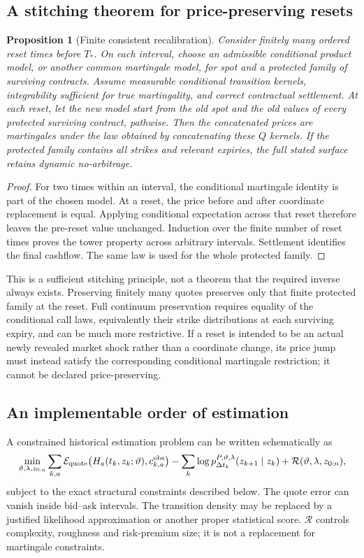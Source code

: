 \documentclass[11pt,a4paper]{article}
\numberwithin{equation}{section}
\newtheorem{proposition}[theorem]{Proposition}
\theoremstyle{definition}\newtheorem{definition}[theorem]{Definition}
\theoremstyle{remark}\newtheorem{remark}[theorem]{Remark}
\begin{document}
\subsection{A stitching theorem for price-preserving resets}
\begin{proposition}[Finite consistent recalibration]
\label{prop:stitch}
Consider finitely many ordered reset times before $T_*$. On each interval, choose an admissible conditional product model, or another common martingale model, for spot and a protected family of surviving contracts. Assume measurable conditional transition kernels, integrability sufficient for true martingality, and correct contractual settlement. At each reset, let the new model start from the old spot and the old values of every protected surviving contract, pathwise. Then the concatenated prices are martingales under the law obtained by concatenating these $Q$ kernels. If the protected family contains all strikes and relevant expiries, the full stated surface retains dynamic no-arbitrage.
\end{proposition}
\begin{proof}
For two times within an interval, the conditional martingale identity is part of the chosen model. At a reset, the price before and after coordinate replacement is equal. Applying conditional expectation across that reset therefore leaves the pre-reset value unchanged. Induction over the finite number of reset times proves the tower property across arbitrary intervals. Settlement identifies the final cashflow. The same law is used for the whole protected family.
\end{proof}
This is a sufficient stitching principle, not a theorem that the required inverse always exists. Preserving finitely many quotes preserves only that finite protected family at the reset. Full continuum preservation requires equality of the conditional call laws, equivalently their strike distributions at each surviving expiry, and can be much more restrictive. If a reset is intended to be an actual newly revealed market shock rather than a coordinate change, its price jump must instead satisfy the corresponding conditional martingale restriction; it cannot be declared price-preserving.

\subsection{An implementable order of estimation}
A constrained historical estimation problem can be written schematically as
\begin{equation}
 \min_{\vartheta,\lambda,z_{0:n}}
 \sum_{k,a}\mathcal E_{\rm quote}\!\left(H_a(t_k,z_k;\vartheta),c_{k,a}^{\rm obs}\right)
 -\sum_{k}\log p^{P,\vartheta,\lambda}_{\Delta t_k}(z_{k+1}\mid z_k)
 +\mathcal R(\vartheta,\lambda,z_{0:n}),
 \label{eq:joint-fit}
\end{equation}
subject to the exact structural constraints described below. The quote error can vanish inside bid--ask intervals. The transition density may be replaced by a justified likelihood approximation or another proper statistical score. $\mathcal R$ controls complexity, roughness and risk-premium size; it is not a replacement for martingale constraints.
\end{document}
